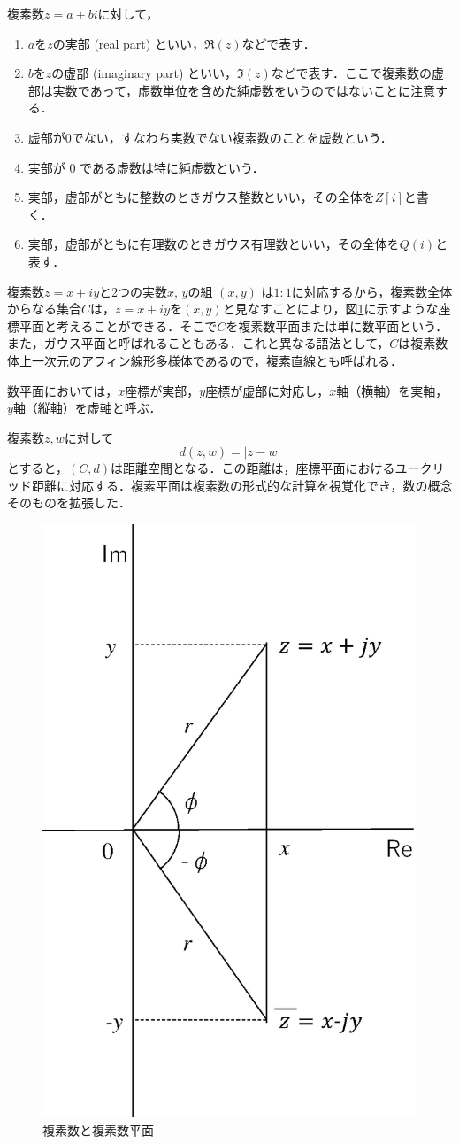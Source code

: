 複素数$z = a + bi$に対して，
\begin{enumerate}
\item $a$を$z$の実部 (real part) といい，$\Re (z)$などで表す．
\item $b$を$z$の虚部 (imaginary part) といい，$\Im(z)$などで表す．ここで複素数の虚部は実数であって，虚数単位を含めた純虚数をいうのではないことに注意する．

\item 虚部が0でない，すなわち実数でない複素数のことを虚数という．
\item 実部が 0 である虚数は特に純虚数という．
\item 実部，虚部がともに整数のときガウス整数といい，その全体を$Z[i]$と書く．
\item 実部，虚部がともに有理数のときガウス有理数といい，その全体を$Q(i)$と表す．
\end{enumerate}

複素数$z = x + iy$と2つの実数$x$, $y$の組 $(x, y)$ は$1 : 1$に対応するから，複素数全体からなる集合$C$は，$z = x + iy$を$(x, y)$と見なすことにより，図\ref{fig:fukuso-heimen}に示すような座標平面と考えることができる．そこで$C$を複素数平面または単に数平面という．また，ガウス平面と呼ばれることもある．これと異なる語法として，$C$は複素数体上一次元のアフィン線形多様体であるので，複素直線とも呼ばれる．

数平面においては，$x$座標が実部，$y$座標が虚部に対応し，$x$軸（横軸）を実軸，$y$軸（縦軸）を虚軸と呼ぶ．

複素数$ z, w $に対して
\begin{equation}
d(z, w) = |z - w|
\end{equation}
とすると，$(C, d)$は距離空間となる．この距離は，座標平面におけるユークリッド距離に対応する．複素平面は複素数の形式的な計算を視覚化でき，数の概念そのものを拡張した．

\begin{figure}[H]
\begin{center}
\includegraphics[width=.45\textwidth]{fig/zu-0-3-1.eps}
\end{center}
\caption{複素数と複素数平面}
\label{fig:fukuso-heimen}
\end{figure}

